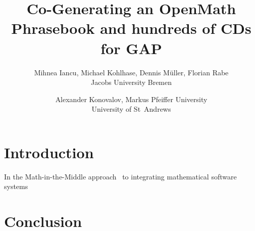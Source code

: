 \documentclass[a4paper]{article}
\author{
  Mihnea Iancu, Michael Kohlhase, Dennis M\"uller, Florian Rabe\\  Jacobs University Bremen \and 
  Alexander Konovalov, Markus Pfeiffer University\\ University  of St~Andrews 
}
\title{Co-Generating an OpenMath Phrasebook and hundreds of CDs for GAP}
\begin{document}
\maketitle
\begin{abstract}
  
\end{abstract}
\section{Introduction}\label{sec:intro}
In the Math-in-the-Middle approach~\cite{DehKohKon:iop16} to integrating mathematical
software systems
\section{Conclusion}\label{sec:concl}
\printbibliography
\end{document}
